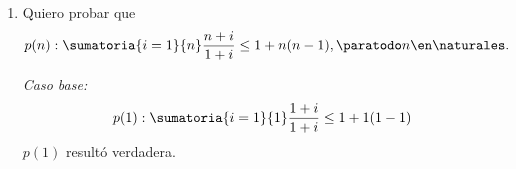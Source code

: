 \begin{enumerate}[label=\magenta{\roman*)}]
\begin{enumerate}[label=\arabic*)]
                Desarrollemos el lado izquierdo de la desigualdad:
                \begin{align*}
                            & 3^{n+1} = 3 \cdot 3^n \mayorIgual{HI} 3 \cdot n^3 \mayorIgual{Aux} (n+1)^3, \ n \geq 3 \\
                            & 3^{n+1} \geq (n+1)^3, \ n \geq 3                                                       \\
                  \entonces & P(n+1): V, \ n \geq 3
                \end{align*}
        \end{enumerate}

        Hemos probado el caso base y el paso inductivo, este último para los $n \geq 3$. Como solo probamos el paso
        inductivo para $n \geq 3$, deberiamos ver que $P(2)$ y $P(3)$ son verdaderas.
        \begin{align*}
          P(2) & : 3^2 \geq 2^3 \entonces P(2): 9 \geq 9 \entonces P(2): V \\
          P(3) & : 3^3 \geq 3^3 \entonces P(3): V
        \end{align*}
        Tenemos que

        $P(1): V \land \ P(2): V \land  P(3): V \\
          \text{si } n \geq 3, \ P(n): V \entonces P(n+1): V$

        Concluimos que $\paratodo n \en \naturales, \ P(n): V$.

        \subsubsection*{Auxiliar}
        $3n^3 \geq (n+1)^3 \sisolosi \sqrt[3]{3n^3} \geq \sqrt[3]{(n+1)^3} \sisolosi
          \sqrt[3]{3}n \geq n+1 \sisolosi \sqrt[3]{3}n - n \geq 1 \\
          \sisolosi n(\sqrt[3]{3} - 1) \geq 1 \sisolosi  n \geq \frac{1}{\sqrt[3]{3} - 1}
          \approx 2.6 \sisolosi n \geq 3$ \\
        $\therefore 3n^3 \geq (n+1)^3 \sisolosi n \geq 3$

  \item Quiero probar que
        $$
          p(n):
          \sumatoria{i=1}{n} \frac{n+i}{1+i} \leq 1 + n(n-1), \paratodo n \en \naturales.
        $$

        \textit{Caso base:}
        $$
          p(1) : \sumatoria{i=1}{1} \frac{1+i}{1+i} \leq 1 + 1(1-1)
        $$
        $p(1)$ resultó verdadera.


\end{enumerate}
